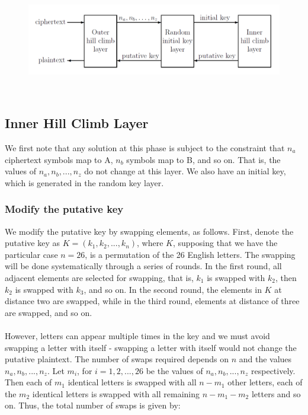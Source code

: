 \documentclass[Lau,binding=0.6cm,oneside]{sapthesis}
\begin{document}
\begin{figure}[H]
\includegraphics[scale=0.35]{hill_climb_scheme}
\centering
\caption{}
\centering
\end{figure}
\ \\

\subsection{Inner Hill Climb Layer}
We first note that any solution at this phase is subject to the constraint that $n_a$ ciphertext symbols map to \textsf{A}, $n_b$ symbols map to \textsf{B}, and so on. That is, the values of $n_a, n_b, ..., n_z$ do not change at this layer. We also have an initial key, which is generated in the random key layer.\\
\subsubsection{Modify the putative key}
We modify the putative key by swapping elements, as follows. First, denote the putative key as $K = (k_1, k_2, ..., k_n)$, where $K$, supposing that we have the particular case $n=26$, is a permutation of the 26 English letters. The swapping will be done systematically through a series of rounds. In the first round, all adjacent elements are selected for swapping, that is, $k_1$ is swapped with $k_2$, then $k_2$ is swapped with $k_3$, and so on. In the second round, the elements in $K$ at distance two are swapped, while in the third round, elements at distance of three are swapped, and so on.\\\\
However, letters can appear multiple times in the key and we must avoid swapping a letter with itself - swapping a letter with itself would not change the putative plaintext. The number of swaps required depends on $n$ and the values $n_a, n_b, ..., n_z$. Let $m_i$, for $i=1,2,...,26$ be the values of $n_a, n_b, ..., n_z$ respectively. Then each of $m_1$ identical letters is swapped with all $n-m_1$ other letters, each of the $m_2$ identical letters is swapped with all remaining $n - m_1 - m_2$ letters and so on. Thus, the total number of swaps is given by:\\
\end{document}
